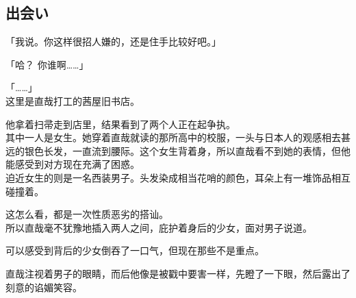 \subsection{出会い}

「我说。你这样很招人嫌的，还是住手比较好吧。」

「哈？ 你谁啊……」

「……」\\

这里是直哉打工的茜屋旧书店。

他拿着扫帚走到店里，结果看到了两个人正在起争执。\\ %

其中一人是女生。她穿着直哉就读的那所高中的校服，一头与日本人的观感相去甚远的银色长发，一直流到腰际。这个女生背着身，所以直哉看不到她的表情，但他能感受到对方现在充满了困惑。\\

迫近女生的则是一名西装男子。头发染成相当花哨的颜色，耳朵上有一堆饰品相互碰撞着。

这怎么看，都是一次性质恶劣的搭讪。\\

所以直哉毫不犹豫地插入两人之间，庇护着身后的少女，面对男子说道。

可以感受到背后的少女倒吞了一口气，但现在那些不是重点。

直哉注视着男子的眼睛，而后他像是被戳中要害一样，先瞪了一下眼，然后露出了刻意的谄媚笑容。\\


